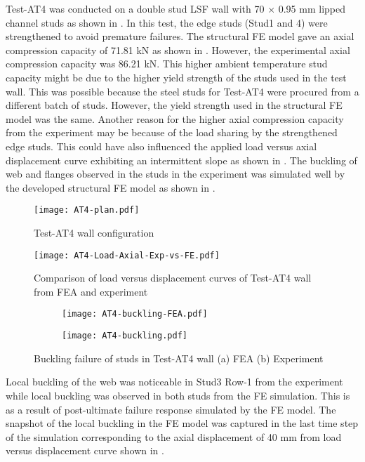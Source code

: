 Test-AT4 was conducted on a double stud LSF wall with 70 $\times$ 0.95 mm lipped channel studs as shown in . In this test, the edge studs (Stud1 and 4) were strengthened to avoid premature failures. The structural FE model gave an axial compression capacity of 71.81 kN as shown in . However, the experimental axial compression capacity was 86.21 kN. This higher ambient temperature stud capacity might be due to the higher yield strength of the studs used in the test wall. This was possible because the steel studs for Test-AT4 were procured from a different batch of studs. However, the yield strength used in the structural FE model was the same. Another reason for the higher axial compression capacity from the experiment may be because of the load sharing by the strengthened edge studs. This could have also influenced the applied load versus axial displacement curve exhibiting an intermittent slope as shown in . The buckling of web and flanges observed in the studs in the experiment was simulated well by the developed structural FE model as shown in .
\begin{figure}[!htbp]
	\centering
			\texttt{[image: AT4-plan.pdf]}\\
		\caption{Test-AT4 wall configuration}
		\label{fig:AT4-plan-fea}
\end{figure}
\begin{figure}[!htbp]
	\centering
			\texttt{[image: AT4-Load-Axial-Exp-vs-FE.pdf]}\\
		\caption{Comparison of load versus displacement curves of Test-AT4 wall from FEA and experiment}
		\label{fig:AT4-fea}
\end{figure}
\begin{figure}[!htbp]
	\centering
	\begin{subfigure}[b]{0.35\textwidth}
		\centering
		\texttt{[image: AT4-buckling-FEA.pdf]}
		\caption{}
		\label{subfig:AT4-buckling-FEA}
	\end{subfigure}
	\begin{subfigure}[b]{0.35\textwidth}
		\centering
		\texttt{[image: AT4-buckling.pdf]}
		\caption{}
		\label{subfig:AT4-buckling-experiment}
	\end{subfigure}
	   \caption{Buckling failure of studs in Test-AT4 wall (a) FEA (b) Experiment}
	   \label{fig:AT4-buckling-fea-comparison}
\end{figure} 

Local buckling of the web was noticeable in Stud3 Row-1 from the experiment while local buckling was observed in both studs from the FE simulation. This is as a result of post-ultimate failure response simulated by the FE model. The snapshot of the local buckling in the FE model was captured in the last time step of the simulation corresponding to the axial displacement of 40 mm from load versus displacement curve shown in . 
 
